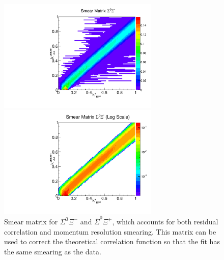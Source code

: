 \begin{figure}[h]
\begin{minipage}{18pc}
\includegraphics[width=18pc]{Figures/SmearMatrices/2016-7-19-SmearMatrixSigmaXiCNormLLAA.pdf}
\end{minipage}\hspace{2pc}
\begin{minipage}{18pc}
\includegraphics[width=18pc]{Figures/SmearMatrices/2016-7-19-SmearMatrixSigmaXiCNormLLAALog.pdf}
\end{minipage} 
\caption[Smear matrix -- $\Sigma^0\Xi^{-}$ and $\bar{\Sigma}^0\Xi^{+}$]{
Smear matrix for $\Sigma^0\Xi^{-}$ and $\bar{\Sigma}^0\Xi^{+}$, which accounts for both residual correlation and momentum resolution smearing. This matrix can be used to correct the theoretical correlation function so that the fit has the same smearing as the data.
}
\end{figure}


